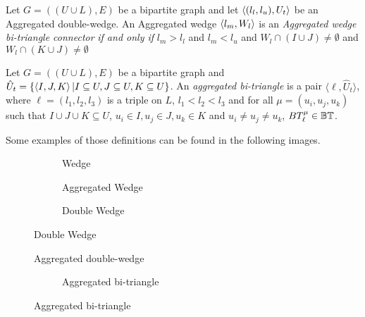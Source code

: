 \begin{definition}\label{def:awgc}
Let $G=((U\cup L),E)$ be a bipartite graph and let $\left\langle (l_l, l_u), U_t \right\rangle$ be an Aggregated double-wedge. 
An Aggregated wedge $\left\langle l_m, W_l \right\rangle$ is an \textit{Aggregated wedge bi-triangle connector} \emph{if and only if} $l_m > l_l$ and $l_m < l_u$ and $W_l \cap (I \cup J) \neq \emptyset$ and $W_l \cap (K \cup J) \neq \emptyset$
\end{definition}
      
\begin{definition}\label{def:abt}
Let $G=((U\cup L),E)$ be a bipartite graph and  $\hat{U}_t=\{\left\langle I, J, K\right\rangle | I \subseteq U, J \subseteq U, K \subseteq U\}$. An \textit{aggregated bi-triangle}  is a pair  $\langle \ell, \hat{U}_t\rangle$, 
where $\ell=(l_1, l_2, l_3)$ is a triple on $L$, $l_1 < l_2 < l_3$ and for all $\mu=(u_i, u_j, u_k)$ such that $I \cup J \cup K \subseteq U$, $u_i \in I, u_j \in J, u_k \in K$ and $u_i \neq u_j \neq u_k$, $BT_{\ell}^{\mu}\in \mathbb{BT}$.
\end{definition}

Some examples of those definitions can be found in the following images.

\begin{figure}[htp!]
\begin{subfigure}[b]{0.3\textwidth}
\centering
{}
\caption{Wedge}
\label{fig:wedge-example}
\end{subfigure}
\begin{subfigure}[b]{0.3\textwidth}
\centering
{}
\caption{Aggregated Wedge}
\label{fig:agg-wedge-example}
\end{subfigure}
\begin{subfigure}[b]{0.3\textwidth}
\centering
{}
\caption{Double Wedge}
\label{fig:double-wedge-example}
\end{subfigure}
\end{figure}


\begin{figure}[htp!]
\centering
{}
\caption{Aggregated double-wedge}
\label{fig:agg-double-wedge-example}
\end{figure}

\begin{figure}[htp!]
\begin{subfigure}[b]{1\textwidth}
\centering      
{}
\caption{Aggregated bi-triangle}
\label{fig:agg-bt-example}
\end{subfigure}
\end{figure}


